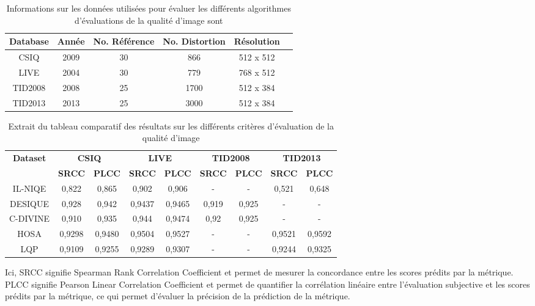 \documentclass{ieeeaccess}
\begin{document}
\newline

\begin{table}[h]
\caption{Informations sur les données utilisées pour évaluer les différents algorithmes d’évaluations de la qualité d’image sont}
\label{table_databases}
\setlength{\tabcolsep}{5.5pt}
\begin{tabular}{|c|c|c|c|c|c|}
    \hline
    \textbf{Database} & \textbf{Année} & \textbf{No. Référence} & \textbf{No. Distortion} & \textbf{Résolution} \\
    \hline
    CSIQ & 2009 & 30 & 866 & 512 x 512 \\
    LIVE & 2004 & 30 & 779 & 768 x 512 \\
    TID2008 & 2008 & 25 & 1700 & 512 x 384 \\
    TID2013 & 2013 & 25 & 3000 & 512 x 384 \\
    \hline
\end{tabular}
\end{table}

\begin{table}[h]
\caption{Extrait du tableau comparatif des résultats sur les différents critères d’évaluation de la qualité d’image}
\label{table_nouveau}
\setlength{\tabcolsep}{1.7pt}
\begin{tabular}{|c|c|c|c|c|c|c|c|c|}
    \hline
    \textbf{Dataset} & \multicolumn{2}{c|}{\textbf{CSIQ}} & \multicolumn{2}{c|}{\textbf{LIVE}} & \multicolumn{2}{c|}{\textbf{TID2008}} & \multicolumn{2}{c|}{\textbf{TID2013}} \\
    \cline{2-9}
    & \textbf{SRCC} & \textbf{PLCC} & \textbf{SRCC} & \textbf{PLCC} & \textbf{SRCC} & \textbf{PLCC} & \textbf{SRCC} & \textbf{PLCC} \\
    \hline
    IL-NIQE & 0,822 & 0,865 & 0,902 & 0,906 & - & - & 0,521 & 0,648 \\
    DESIQUE & 0,928 & 0,942 & 0,9437 & 0,9465 & 0,919 & 0,925 & - & - \\
    C-DIVINE & 0,910 & 0,935 & 0,944 & 0,9474 & 0,92 & 0,925 & - & - \\
    HOSA & 0,9298 & 0,9480 & 0,9504 & 0,9527 & - & - & 0,9521 & 0,9592 \\
    LQP & 0,9109 & 0,9255 & 0,9289 & 0,9307 & - & - & 0,9244 & 0,9325 \\
    \hline
\end{tabular}
\end{table}

Ici, SRCC signifie Spearman Rank Correlation Coefficient et permet de mesurer la concordance entre les scores prédits par la métrique. PLCC signifie Pearson Linear Correlation Coefficient et permet de quantifier la corrélation linéaire entre l'évaluation subjective et les scores prédits par la métrique, ce qui permet d'évaluer la précision de la prédiction de la métrique. 
\end{document}
